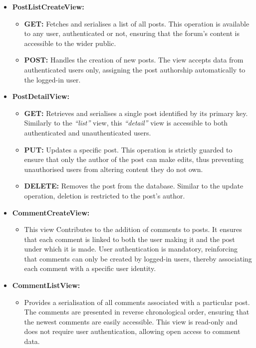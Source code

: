 \begin{itemize}
    \item \textbf{PostListCreateView:}
    \begin{itemize}
        \item \textbf{GET:} Fetches and serialises a list of all posts. This operation is available to any user, authenticated or not, ensuring that the forum's content is accessible to the wider public.
        \item \textbf{POST:} Handles the creation of new posts. The view accepts data from authenticated users only, assigning the post authorship automatically to the logged-in user. 
    \end{itemize}

    \item \textbf{PostDetailView:}
    \begin{itemize}
        \item \textbf{GET:} Retrieves and serialises a single post identified by its primary key. Similarly to the \textit{``list''} view, this \textit{``detail''} view is accessible to both authenticated and unauthenticated users.
        \item \textbf{PUT:} Updates a specific post. This operation is strictly guarded to ensure that only the author of the post can make edits, thus preventing unauthorised users from altering content they do not own.
        \item \textbf{DELETE:} Removes the post from the database. Similar to the update operation, deletion is restricted to the post's author.
    \end{itemize}

    \item \textbf{CommentCreateView:}
    \begin{itemize}
        \item This view Contributes to the addition of comments to posts. It ensures that each comment is linked to both the user making it and the post under which it is made. User authentication is mandatory, reinforcing that comments can only be created by logged-in users, thereby associating each comment with a specific user identity.
    \end{itemize}

    \item \textbf{CommentListView:}
    \begin{itemize}
        \item Provides a serialisation of all comments associated with a particular post. The comments are presented in reverse chronological order, ensuring that the newest comments are easily accessible. This view is read-only and does not require user authentication, allowing open access to comment data.
    \end{itemize}


\end{itemize}
